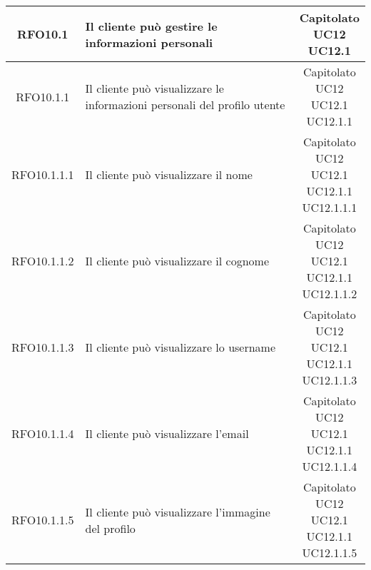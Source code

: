 \begin{longtable}{|c|p{8cm}|c|}
\hypertarget{RFO10.1}{RFO10.1} & Il cliente può gestire le informazioni personali & \makecell*{Capitolato\\UC12\\UC12.1} \\
\hline

\hypertarget{RFO10.1.1}{RFO10.1.1} & Il cliente può visualizzare le informazioni personali del profilo utente &\makecell*{Capitolato\\UC12\\UC12.1\\UC12.1.1} \\
\hline

\hypertarget{RFO10.1.1.1}{RFO10.1.1.1} & Il cliente può visualizzare il nome & \makecell*{Capitolato\\UC12\\UC12.1\\UC12.1.1\\UC12.1.1.1} \\
\hline

\hypertarget{RFO10.1.1.2}{RFO10.1.1.2} & Il cliente può visualizzare il cognome & \makecell*{Capitolato\\UC12\\UC12.1\\UC12.1.1\\UC12.1.1.2} \\
\hline

\hypertarget{RFO10.1.1.3}{RFO10.1.1.3} & Il cliente può visualizzare lo username & \makecell*{Capitolato\\UC12\\UC12.1\\UC12.1.1\\UC12.1.1.3} \\
\hline

\hypertarget{RFO10.1.1.4}{RFO10.1.1.4} & Il cliente può visualizzare l'email & \makecell*{Capitolato\\UC12\\UC12.1\\UC12.1.1\\UC12.1.1.4} \\
\hline

\hypertarget{RFO10.1.1.5}{RFO10.1.1.5} &  Il cliente può visualizzare l'immagine del profilo & \makecell*{Capitolato\\UC12\\UC12.1\\UC12.1.1\\UC12.1.1.5} \\
\hline


\end{longtable}
